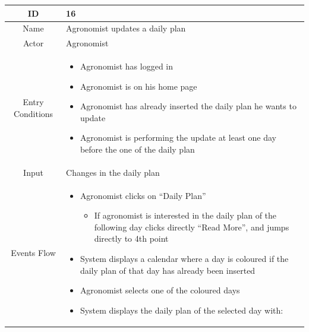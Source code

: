 \documentclass{article}
\begin{document}
\begin{center}
    \newpage
    
    
    
    
    
    
    
    
    
    
    
    \begin{longtable}{|c| p{10cm}|}
        \hline
            ID & 16 \\
        \hline
            Name & Agronomist updates a daily plan\\
        \hline
            Actor & Agronomist \\
        \hline
            Entry Conditions &  \begin{itemize}
                                    \item Agronomist has logged in
                                    \item Agronomist is on his home page
                                    \item Agronomist has already inserted the daily plan he wants to update
                                    \item Agronomist is performing the update at least one day before the one of the daily plan
                                \end{itemize}\\
        \hline
            Input & Changes in the daily plan \\
        \hline
            Events Flow &   \begin{itemize}
                                \item Agronomist clicks on “Daily Plan”  
                                        \begin{itemize}
                                            \item If agronomist is interested in the daily plan of the following day clicks directly “Read More”, and jumps directly to 4th point
                                        \end{itemize}
                                \item System displays a calendar where a day is coloured if the daily plan of that day has already been inserted
                                \item Agronomist selects one of the coloured days
                                \item System displays the daily plan of the selected day with:

\end{itemize}
\end{longtable}
\end{center}
\end{document}
